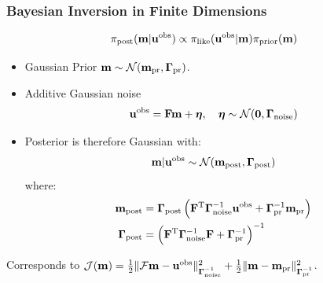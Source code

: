 \documentclass[
    pdf,
    10pt,
    xcolor={svgnames},
  ]{beamer}
\newcommand{\mc}[1]{\mathcal{#1}}
\newcommand{\T}{\mathrm{T}}
\newcommand{\mat}[1]{\mathbf{{#1}}}
\newcommand{\obs}{\mathbf{u}^{\rm obs}}
\begin{document}
\begin{frame}
  \frametitle{Bayesian Inversion in Finite Dimensions}
  \begin{theorem}
    \[
      \pi_{\rm post}(\vb{m} | \mathbf{u}^{\rm obs})
      \propto
      \pi_{\rm like}(\mathbf{u}^{\rm obs} | \vb{m})
      \pi_{\rm prior}(\vb{m})
    \]
  \end{theorem}
  \begin{itemize}
    \item Gaussian Prior $\vb{m} \sim \mc{N}(\vb{m}_{\rm pr}, \mat{\Gamma}_{\rm pr})$.
    \item Additive Gaussian noise
      \[
        \obs = \mat{F} \vb{m} + \vb*{\eta},
        \quad \vb*{\eta} \sim \mc{N}(\vb{0}, \mat{\Gamma}_{\rm noise})
      \]
    \item Posterior is therefore Gaussian with:
      \[
        \vb{m} | \mathbf{u}^{\rm obs} 
        \sim \mc{N}(\vb{m}_{\rm post} , \vb{\Gamma}_{\rm post})
      \]
      where:
      \begin{align*}
        \vb{m}_{\rm post}
        &=
        \vb{\Gamma}_{\rm post}
        \left(
          \mat{F}^\T \vb{\Gamma}_{\rm noise}^{-1} \mathbf{u}^{\rm obs}
          + \vb{\Gamma}_{\rm pr}^{-1} \vb{m}_{\rm pr}
        \right) \\
        \vb{\Gamma}_{\rm post}
        &=
        \left(
          \mat{F}^\T \vb{\Gamma}_{\rm noise}^{-1} \mat{F}
          + \vb{\Gamma}_{\rm pr}^{-1}
        \right)^{-1} \\
      \end{align*}
  \end{itemize}
  Corresponds to
  \(
    \mc{J}(\vb{m})
    = \frac{1}{2} \| \mc{F}\vb{m} - \obs \|_{\vb{\Gamma}_{\rm noise}^{-1}}^2
    + \frac{1}{2} \| \vb{m} - \vb{m}_{\rm pr}\|_{\vb{\Gamma}_{\rm pr}^{-1}}^2
  \).
\end{frame}
\end{document}
